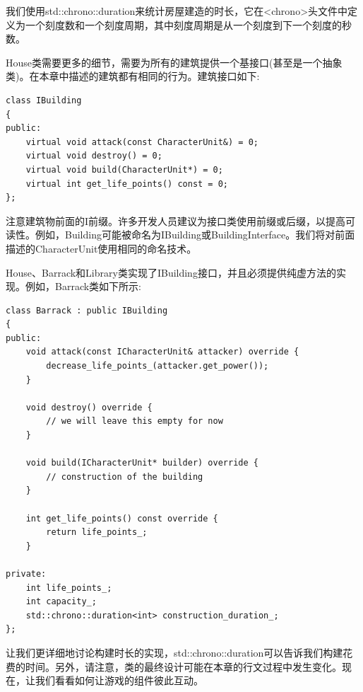 我们使用std::chrono::duration来统计房屋建造的时长，它在<chrono>头文件中定义为一个刻度数和一个刻度周期，其中刻度周期是从一个刻度到下一个刻度的秒数。 \par
House类需要更多的细节，需要为所有的建筑提供一个基接口(甚至是一个抽象类)。在本章中描述的建筑都有相同的行为。建筑接口如下: \par

\begin{lstlisting}[caption={}]
class IBuilding
{
public:
	virtual void attack(const CharacterUnit&) = 0;
	virtual void destroy() = 0;
	virtual void build(CharacterUnit*) = 0;
	virtual int get_life_points() const = 0;
};
\end{lstlisting}

注意建筑物前面的I前缀。许多开发人员建议为接口类使用前缀或后缀，以提高可读性。例如，Building可能被命名为IBuilding或BuildingInterface。我们将对前面描述的CharacterUnit使用相同的命名技术。 \par
House、Barrack和Library类实现了IBuilding接口，并且必须提供纯虚方法的实现。例如，Barrack类如下所示: \par

\begin{lstlisting}[caption={}]
class Barrack : public IBuilding
{
public:
	void attack(const ICharacterUnit& attacker) override {
		decrease_life_points_(attacker.get_power());
	}

	void destroy() override {
		// we will leave this empty for now
	}

	void build(ICharacterUnit* builder) override {
		// construction of the building
	}

	int get_life_points() const override {
		return life_points_;
	}

private:
	int life_points_;
	int capacity_;
	std::chrono::duration<int> construction_duration_;
};
\end{lstlisting}

让我们更详细地讨论构建时长的实现，std::chrono::duration可以告诉我们构建花费的时间。另外，请注意，类的最终设计可能在本章的行文过程中发生变化。现在，让我们看看如何让游戏的组件彼此互动。 \par

